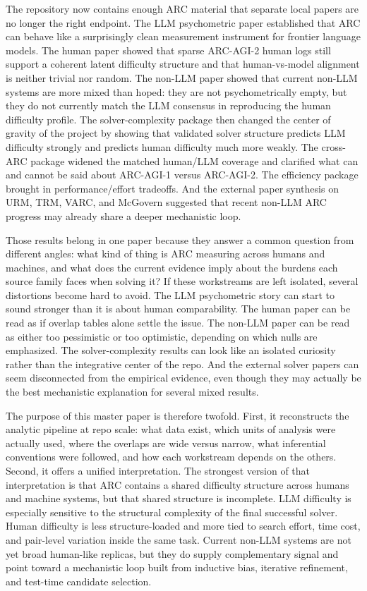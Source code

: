 \documentclass[11pt,letterpaper]{article}
\begin{document}
The repository now contains enough ARC material that separate local papers are no longer the right endpoint. The LLM psychometric paper established that ARC can behave like a surprisingly clean measurement instrument for frontier language models. The human paper showed that sparse ARC-AGI-2 human logs still support a coherent latent difficulty structure and that human-vs-model alignment is neither trivial nor random. The non-LLM paper showed that current non-LLM systems are more mixed than hoped: they are not psychometrically empty, but they do not currently match the LLM consensus in reproducing the human difficulty profile. The solver-complexity package then changed the center of gravity of the project by showing that validated solver structure predicts LLM difficulty strongly and predicts human difficulty much more weakly. The cross-ARC package widened the matched human/LLM coverage and clarified what can and cannot be said about ARC-AGI-1 versus ARC-AGI-2. The efficiency package brought in performance/effort tradeoffs. And the external paper synthesis on URM, TRM, VARC, and McGovern suggested that recent non-LLM ARC progress may already share a deeper mechanistic loop.

Those results belong in one paper because they answer a common question from different angles: what kind of thing is ARC measuring across humans and machines, and what does the current evidence imply about the burdens each source family faces when solving it? If these workstreams are left isolated, several distortions become hard to avoid. The LLM psychometric story can start to sound stronger than it is about human comparability. The human paper can be read as if overlap tables alone settle the issue. The non-LLM paper can be read as either too pessimistic or too optimistic, depending on which nulls are emphasized. The solver-complexity results can look like an isolated curiosity rather than the integrative center of the repo. And the external solver papers can seem disconnected from the empirical evidence, even though they may actually be the best mechanistic explanation for several mixed results.

The purpose of this master paper is therefore twofold. First, it reconstructs the analytic pipeline at repo scale: what data exist, which units of analysis were actually used, where the overlaps are wide versus narrow, what inferential conventions were followed, and how each workstream depends on the others. Second, it offers a unified interpretation. The strongest version of that interpretation is that ARC contains a shared difficulty structure across humans and machine systems, but that shared structure is incomplete. LLM difficulty is especially sensitive to the structural complexity of the final successful solver. Human difficulty is less structure-loaded and more tied to search effort, time cost, and pair-level variation inside the same task. Current non-LLM systems are not yet broad human-like replicas, but they do supply complementary signal and point toward a mechanistic loop built from inductive bias, iterative refinement, and test-time candidate selection.
\end{document}

